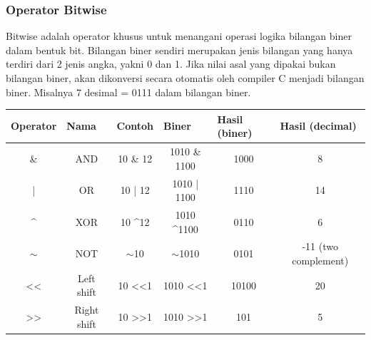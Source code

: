\subsubsection{Operator Bitwise}
Bitwise adalah operator khusus untuk menangani operasi logika bilangan biner dalam bentuk bit.
Bilangan biner sendiri merupakan jenis bilangan yang hanya terdiri dari 2 jenis angka, yakni 0 dan 1.
Jika nilai asal yang dipakai bukan bilangan biner, akan dikonversi secara otomatis oleh compiler C menjadi bilangan biner. Misalnya 7 desimal = 0111 dalam bilangan biner.
\\
\begin{center}
	\begin{tabular}{|c|c|c|c|c|c|}
		\hline
		\multicolumn{1}{|l|}{\textbf{Operator}} & \multicolumn{1}{|l|}{\textbf{Nama}} & \multicolumn{1}{|l|}{\textbf{Contoh}} & \multicolumn{1}{|l|}{\textbf{Biner}} & \multicolumn{1}{|l|}{\textbf{Hasil (biner)}} & \multicolumn{1}{|l|}{\textbf{Hasil (decimal)}} \\ \hline
		\&                                      & AND                                 & 10 \& 12                              & 1010 \& 1100                         & 1000                                         & 8                                              \\ \hline
		|                                       & OR                                  & 10 | 12                               & 1010 | 1100                          & 1110                                         & 14                                             \\ \hline
		\textasciicircum{}                      & XOR                                 & 10 \textasciicircum 12                & 1010 \textasciicircum 1100           & 0110                                         & 6                                              \\ \hline
		$\sim$                                  & NOT                                 & $\sim$10                              & $\sim$1010                           & 0101                                         & -11 (two complement)                           \\ \hline
		\textless{}\textless{}                  & Left shift                          & 10 \textless{}\textless 1             & 1010 \textless{}\textless 1          & 10100                                        & 20                                             \\ \hline
		\textgreater{}\textgreater{}            & Right shift                         & 10 \textgreater{}\textgreater 1       & 1010 \textgreater{}\textgreater 1    & 101                                          & 5                                              \\ \hline
	\end{tabular}
\end{center}


